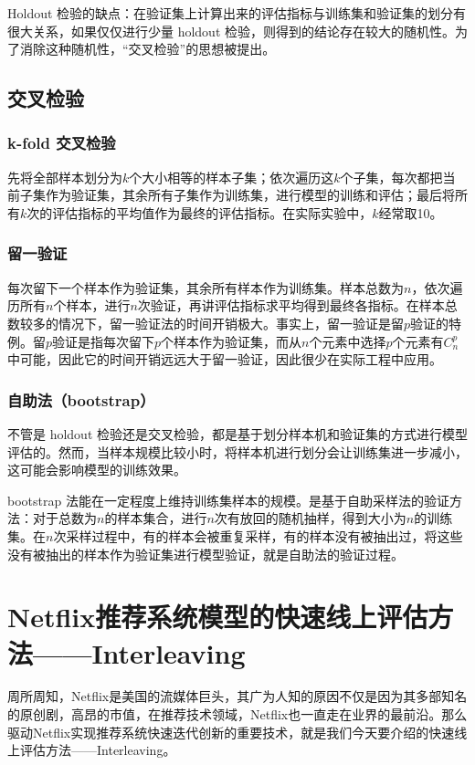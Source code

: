 \documentclass[12pt]{article}
\begin{document}
Holdout 检验的缺点：在验证集上计算出来的评估指标与训练集和验证集的划分有很大关系，如果仅仅进行少量 holdout 检验，则得到的结论存在较大的随机性。为了消除这种随机性，“交叉检验”的思想被提出。

\subsection{交叉检验}
\subsubsection{k-fold 交叉检验}
先将全部样本划分为$k$个大小相等的样本子集；依次遍历这$k$个子集，每次都把当前子集作为验证集，其余所有子集作为训练集，进行模型的训练和评估；最后将所有$k$次的评估指标的平均值作为最终的评估指标。在实际实验中，$k$经常取10。

\subsubsection{留一验证}
每次留下一个样本作为验证集，其余所有样本作为训练集。样本总数为$n$，依次遍历所有$n$个样本，进行$n$次验证，再讲评估指标求平均得到最终各指标。在样本总数较多的情况下，留一验证法的时间开销极大。事实上，留一验证是留$p$验证的特例。留$p$验证是指每次留下$p$个样本作为验证集，而从$n$个元素中选择$p$个元素有$C_n^p$中可能，因此它的时间开销远远大于留一验证，因此很少在实际工程中应用。

\subsubsection{自助法（bootstrap）}
不管是 holdout 检验还是交叉检验，都是基于划分样本机和验证集的方式进行模型评估的。然而，当样本规模比较小时，将样本机进行划分会让训练集进一步减小，这可能会影响模型的训练效果。

bootstrap 法能在一定程度上维持训练集样本的规模。是基于自助采样法的验证方法：对于总数为$n$的样本集合，进行$n$次有放回的随机抽样，得到大小为$n$的训练集。在$n$次采样过程中，有的样本会被重复采样，有的样本没有被抽出过，将这些没有被抽出的样本作为验证集进行模型验证，就是自助法的验证过程。

\section{Netflix推荐系统模型的快速线上评估方法——Interleaving\cite{Interleaving_In_Netflix}}
周所周知，Netflix是美国的流媒体巨头，其广为人知的原因不仅是因为其多部知名的原创剧，高昂的市值，在推荐技术领域，Netflix也一直走在业界的最前沿。那么驱动Netflix实现推荐系统快速迭代创新的重要技术，就是我们今天要介绍的快速线上评估方法——Interleaving。
\end{document}

